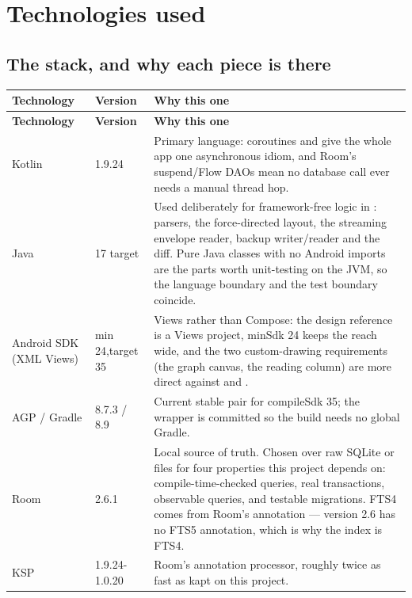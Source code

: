 \section{Technologies used}
\label{sec:tech}

\subsection{The stack, and why each piece is there}

\begin{xltabular}{\linewidth}{L{4.3cm} L{2.15cm} X}
\toprule
\textbf{Technology} & \textbf{Version} & \textbf{Why this one} \\
\midrule
\endfirsthead
\toprule
\textbf{Technology} & \textbf{Version} & \textbf{Why this one} \\
\midrule
\endhead
Kotlin & 1.9.24 &
Primary language: coroutines and  give the whole app one asynchronous idiom, and Room's
suspend/Flow DAOs mean no database call ever needs a manual thread hop. \\
\addlinespace
Java & 17 target &
Used deliberately for framework-free logic in : parsers, the force-directed layout, the
streaming envelope reader, backup writer/reader and the diff. Pure Java classes with no Android imports
are the parts worth unit-testing on the JVM, so the language boundary and the test boundary coincide. \\
\addlinespace
Android SDK (XML Views) & min 24,\newline target 35 &
Views rather than Compose: the design reference is a Views project, minSdk 24 keeps the reach wide, and
the two custom-drawing requirements (the graph canvas, the reading column) are more direct against
 and . \\
\addlinespace
AGP / Gradle & 8.7.3 / 8.9 &
Current stable pair for compileSdk 35; the wrapper is committed so the build needs no global Gradle. \\
\addlinespace
Room & 2.6.1 &
Local source of truth. Chosen over raw SQLite or files for four properties this project depends on:
compile-time-checked queries, real transactions, observable  queries, and testable migrations.
FTS4 comes from Room's  annotation --- version 2.6 has no FTS5 annotation, which is why the
index is FTS4. \\
\addlinespace
KSP & 1.9.24-1.0.20 &
Room's annotation processor, roughly twice as fast as kapt on this project. \\

\end{xltabular}
